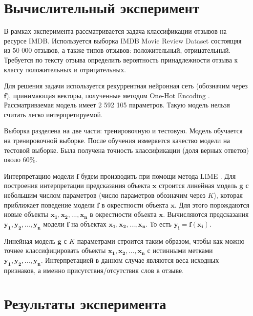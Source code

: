 \documentclass[a4paper, 12pt]{article}
\begin{document}

\section{Вычислительный эксперимент}

В рамках эксперимента рассматривается задача классификации отзывов на ресурсе IMDB. Используется выборка IMDB Movie Review Dataset \cite{maas-EtAl:2011:ACL-HLT2011} состоящяя из 50 000 отзывов, а также типов отзывов: положительный, отрицательный. Требуется по тексту отзыва определить вероятность принадлежности отзыва к классу положительных и отрицательных.

Для решения задачи используется рекуррентная нейронная сеть (обозначим через $\mathbf{f}$), принимающая векторы, полученные методом One-Hot Encoding \cite{onehot2018}. Рассматриваемая модель имеет 2 592 105 параметров. Такую модель нельзя считать легко интерпретируемой.

Выборка разделена на две части: тренировочную и тестовую. Модель обучается на тренировочной выборке. После обучения измеряется качество модели на тестовой выборке. Была получена точность классификации (доля верных ответов) около 60\%.

Интерпретацию модели $\mathbf{f}$ будем производить при помощи метода LIME \cite{ribeiro2016why}. Для построения интерпретации предсказания объекта $\mathbf{x}$ строится линейная модель $\mathbf{g}$ с небольшим числом параметров (число параметров обозначим через $K$), которая приближает поведение модели $\mathbf{f}$ в окрестности объекта $\mathbf{x}$. Для этого порождаются новые объекты $\mathbf{x_1}, \mathbf{x_2}, \dots, \mathbf{x_n}$ в окрестности объекта $\mathbf{x}$. Вычисляются предсказания $\mathbf{y_1}, \mathbf{y_2}, \dots, \mathbf{y_n}$ модели $\mathbf{f}$ на объектах $\mathbf{x_1}, \mathbf{x_2}, \dots, \mathbf{x_n}$. То есть $\mathbf{y_i}=\mathbf{f}(\mathbf{x_i})$.

Линейная модель $\mathbf{g}$ с $K$ параметрами строится таким образом, чтобы как можно точнее классифицировать объекты $\mathbf{x_1}, \mathbf{x_2}, \dots, \mathbf{x_n}$ с истинными метками $\mathbf{y_1}, \mathbf{y_2}, \dots, \mathbf{y_n}$. Интерпретацией в данном случае являются веса исходных признаков, а именно присутствия/отсутствия слов в отзыве.

\section{Результаты эксперимента}
\end{document}

